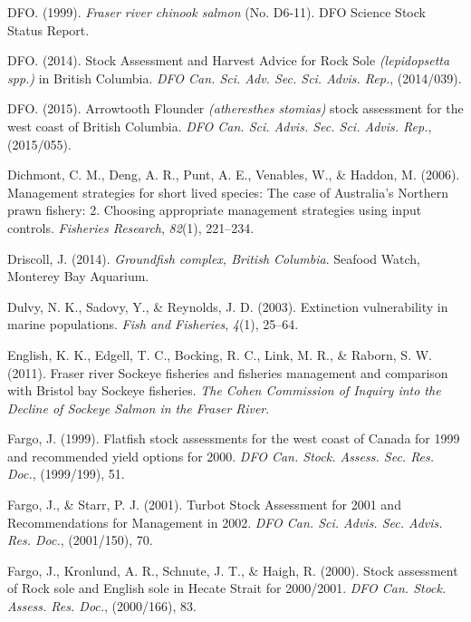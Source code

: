 \documentclass[12pt,]{scrartcl}
\begin{document}
\hypertarget{ref-DFO1999Fraser-River-Ch}{}
DFO. (1999). \emph{Fraser river chinook salmon} (No. D6-11). DFO Science
Stock Status Report.

\hypertarget{ref-dfo2014stock-asse}{}
DFO. (2014). Stock Assessment and Harvest Advice for Rock Sole
\emph{(lepidopsetta spp.)} in British Columbia. \emph{DFO Can. Sci. Adv.
Sec. Sci. Advis. Rep.}, (2014/039).

\hypertarget{ref-dfo2015arrowtooth}{}
DFO. (2015). Arrowtooth Flounder \emph{(atheresthes stomias)} stock
assessment for the west coast of British Columbia. \emph{DFO Can. Sci.
Advis. Sec. Sci. Advis. Rep.}, (2015/055).

\hypertarget{ref-dichmont2006management2}{}
Dichmont, C. M., Deng, A. R., Punt, A. E., Venables, W., \& Haddon, M.
(2006). Management strategies for short lived species: The case of
Australia's Northern prawn fishery: 2. Choosing appropriate management
strategies using input controls. \emph{Fisheries Research},
\emph{82}(1), 221--234.

\hypertarget{ref-Driscoll2014Groundfish-comp}{}
Driscoll, J. (2014). \emph{Groundfish complex, British Columbia}.
Seafood Watch, Monterey Bay Aquarium.

\hypertarget{ref-dulvy2003extinction}{}
Dulvy, N. K., Sadovy, Y., \& Reynolds, J. D. (2003). Extinction
vulnerability in marine populations. \emph{Fish and Fisheries},
\emph{4}(1), 25--64.

\hypertarget{ref-english2011fraser}{}
English, K. K., Edgell, T. C., Bocking, R. C., Link, M. R., \& Raborn,
S. W. (2011). Fraser river Sockeye fisheries and fisheries management
and comparison with Bristol bay Sockeye fisheries. \emph{The Cohen
Commission of Inquiry into the Decline of Sockeye Salmon in the Fraser
River}.

\hypertarget{ref-fargo1999flatfish-s}{}
Fargo, J. (1999). Flatfish stock assessments for the west coast of
Canada for 1999 and recommended yield options for 2000. \emph{DFO Can.
Stock. Assess. Sec. Res. Doc.}, (1999/199), 51.

\hypertarget{ref-fargo2001turbot-sto}{}
Fargo, J., \& Starr, P. J. (2001). Turbot Stock Assessment for 2001 and
Recommendations for Management in 2002. \emph{DFO Can. Sci. Advis. Sec.
Advis. Res. Doc.}, (2001/150), 70.

\hypertarget{ref-fargo2000stock-asse}{}
Fargo, J., Kronlund, A. R., Schnute, J. T., \& Haigh, R. (2000). Stock
assessment of Rock sole and English sole in Hecate Strait for 2000/2001.
\emph{DFO Can. Stock. Assess. Res. Doc.}, (2000/166), 83.
\end{document}
